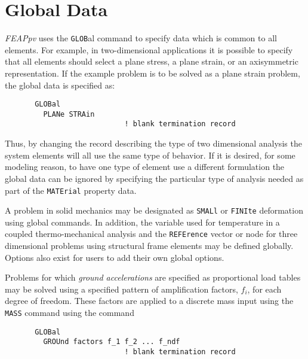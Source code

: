 \section{Global Data}
\label{global}

{\sl FEAPpv} uses the {\tt GLOB}al command to specify data which is common
to all elements.  For
example, in two-dimensional applications it is possible to specify that
all elements should select a plane stress, a plane strain, or an axisymmetric
representation.  If the example problem is to be solved as a plane
strain problem, the global data is specified as:
\begin{verbatim}
       GLOBal
         PLANe STRAin
                            ! blank termination record
\end{verbatim}
\par\noindent
Thus, by changing the record describing the type of two dimensional
analysis the system elements will all use the same type of behavior.  If
it is desired, for some modeling reason, to have one type of element
use a different formulation the global data can be ignored by specifying
the particular type of analysis needed as part of the {\tt MATErial} property
data.

A problem in solid mechanics may be designated as
{\tt SMALl} or {\tt FINIte} deformation using global commands.
In addition, the variable used for temperature in a coupled thermo-mechanical
analysis and the {\tt REFErence} vector or node for three dimensional
problems using structural frame elements may be defined globally.
Options also exist for users to add their own global options.

Problems for which {\it ground accelerations} are specified as proportional
load tables may be solved using a specified pattern of amplification factors,
$f_i$, for each degree of freedom.  These factors are applied to a discrete
mass input using the {\tt MASS} command using the command
\begin{verbatim}
       GLOBal
         GROUnd factors f_1 f_2 ... f_ndf
                            ! blank termination record
\end{verbatim}
